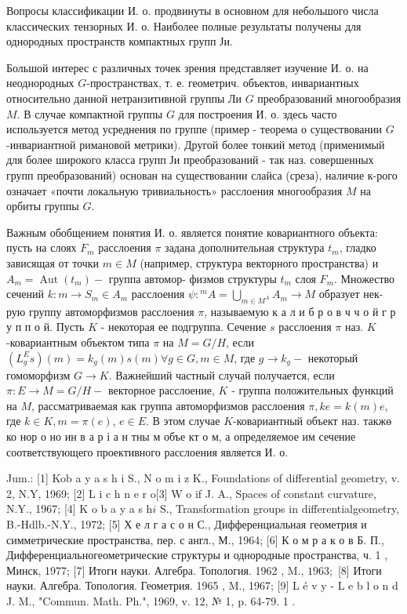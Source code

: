 \documentclass[10pt]{article}
\begin{document}
Вопросы классификации И. о. продвинуты в основном для небольшого числа классических тензорных И. о. Наиболее полные результаты получены для однородных пространств компактных групп Ји.



Большой интерес с различных точек зрения представляет изучение И. о. на неоднородных $G$-пространствах, т. е. геометрич. объектов, инвариантных относительно данной нетранзитивной группы Ли $G$ преобразований многообразия $M$. В случае компактной группы $G$ для построения И. о. здесь часто используется метод усреднения по группе (пример - теорема о существовании $G$-инвариантной римановой метрики). Другой более тонкий метод (применимый для более широкого класса групп Ји преобразований - так наз. совершенных групп преобразований) основан на существовании слайса (среза), наличие к-рого означает «почти локальную тривиальность» расслоения многообразия $M$ на орбиты группы $G$.



Важным обобщением понятия И. о. является понятие ковариантного объекта: пусть на слоях $F_{m}$ расслоения $\pi$ задана дополнительная структура $t_{m}$, гладко зависящая от точки $m \in M$ (например, структура векторного пространства) и $A_{m}=\operatorname{Aut}\left(t_{m}\right)-$ группа автомор- физмов структуры $t_{m}$ слоя $F_{m}$. Множество сечений $k: m \rightarrow S_{m} \in A_{m}$ расслоения $\psi:{ }^{m} A=\bigcup_{m \in M^{A}} A_{m} \rightarrow M$ образует нек-рую группу автоморфизмов расслоения $\pi$, называемую к а л и б р о в ч ч о й $г$ р у п п о й. Пусть $K$ - некоторая ее подгруппа. Сечение $s$ расслоения $\pi$ наз. $K$-ковариантным объектом типа $\pi$ на $M=G / H$, если $\left(L_{g}^{E} s\right)(m)=k_{g}(m) s(m) \forall g \in G, m \in M$, где $g \rightarrow k_{g}-$ некоторый гомоморфизм $G \rightarrow K$. Важнейший частный случай получается, если $\pi: E \rightarrow M=G / H-$ векторное расслоение, $K$ - группа положительных функций на $M$, рассматриваемая как группа автоморфизмов расслоения $\pi, k e=k(m) e$, где $k \in K, m=\pi(e)$, $e \in E$. В этом случае $K$-ковариантный объект наз. такжө ко нор о но ин в а р і а н тны м объе кт о м, а определяемое им сечение соответствующего проективного расслоения является И. о.



Jum.: [1] Kob a y a s h i S., N o m i z $\mathrm{K}$., Foundations of differential geometry, v. 2, N.Y, 1969; [2] L i c h n e r o[3] W o if J. A., Spaces of constant curvature, N.Y., 1967; [4] $\mathrm{K}$ o b a y a s $\mathrm{h} i$ S., Transformation groups in differentialgeometry, B.-Hdlb.-N.Y., 1972; [5] Х е л г а с о н С., Дифференциальная геометрия и симметрические пространства, пер. с англ., М., 1964; [6] К о м р а к о в Б. П., Дифференциальногеометрические структуры и однородные пространства, ч. 1 , Минск, 1977; [7] Итоги науки. Алгебра. Топология. 1962 , M., $1963 ;$ [8] Итоги науки. Алгебра. Топология. Геометрия. 1965 , M., 1967; [9] L é v y - L e b l o n d J. M., "Commun. Math. Ph.", 1969, v. 12, № 1, p. 64-79. 1 .
\end{document}
